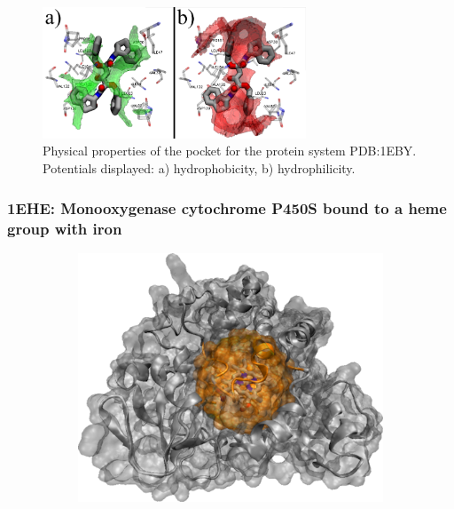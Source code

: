       \begin{figure}[H]
        \centering
        \includegraphics[width=0.7\textwidth]{figures/results/benchmark_prot/1eby.png}
        \caption{\label{fig:benchmark/1eby} Physical properties of the pocket for the protein system PDB:1EBY. Potentials displayed: a) hydrophobicity, b) hydrophilicity.}
      \end{figure}
    \pagebreak

    \subsubsection{1EHE: Monooxygenase cytochrome P450S bound to a heme group with iron}
      \begin{figure}[H] \centering
        \begin{subfigure}[c]{0.3\textwidth} \centering
          \includegraphics[width=1\textwidth]{figures/results/ps_prot/1ehe.png}
        \end{subfigure}
        \begin{subfigure}[c]{0.3\textwidth} \centering
        \end{subfigure}
      \end{figure}

